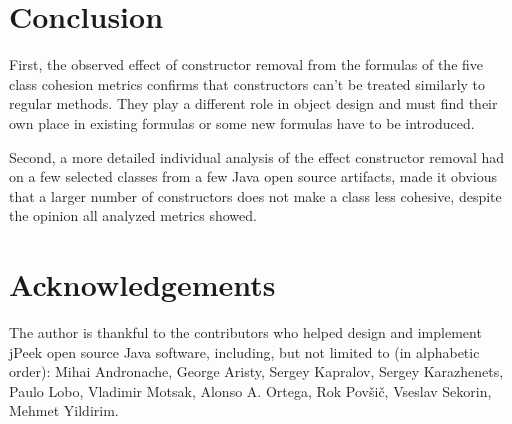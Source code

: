 \documentclass[conference]{IEEEtran}
\newcommand{\nospell}[1]{#1}
\begin{document}
\section{Conclusion}

First, the observed effect of constructor removal from the formulas of the five class cohesion metrics
confirms that constructors can't be treated similarly
to regular methods. They play a different role in object design and must find their own place
in existing formulas or some new formulas have to be introduced.

Second, a more detailed individual analysis of the effect
constructor removal had on a few selected classes from a few
Java open source artifacts, made it obvious that a larger number
of constructors does not make a class less cohesive, despite the
opinion all analyzed metrics showed.

\section{Acknowledgements}

The author is thankful to the contributors who
helped design and implement jPeek open source Java software, including,
but not limited to (in alphabetic order):
\nospell{Mihai Andronache},
\nospell{George Aristy},
\nospell{Sergey Kapralov},
\nospell{Sergey Karazhenets},
\nospell{Paulo Lobo},
\nospell{Vladimir Motsak},
\nospell{Alonso A. Ortega},
\nospell{Rok Pov\v{s}i\v{c}},
\nospell{Vseslav Sekorin},
\nospell{Mehmet Yildirim}.
\end{document}
